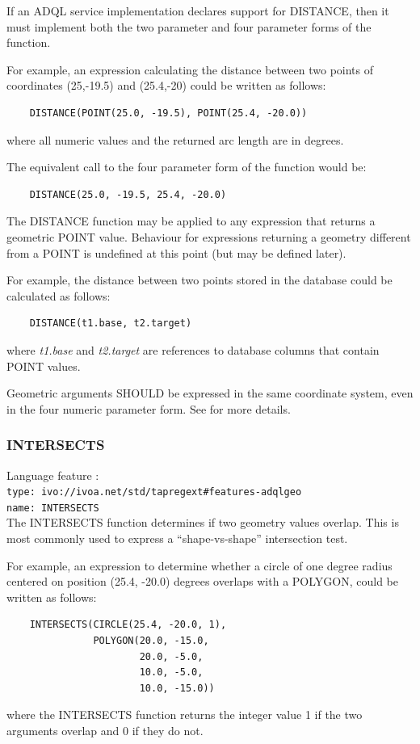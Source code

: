 \documentclass[11pt,a4paper]{ivoa}
\begin{document}
If an ADQL service implementation declares support for DISTANCE,
then it must implement both the two parameter and four parameter
forms of the function.

For example, an expression calculating the distance between two points of
coordinates (25,-19.5) and (25.4,-20) could be written as follows:
\begin{verbatim}
    DISTANCE(POINT(25.0, -19.5), POINT(25.4, -20.0))
\end{verbatim}
\noindent
where all numeric values and the returned arc length are in degrees.

The equivalent call to the four parameter form of the function would be:
\begin{verbatim}
    DISTANCE(25.0, -19.5, 25.4, -20.0)
\end{verbatim}

The DISTANCE function may be applied to any expression that returns a
geometric POINT value. Behaviour for expressions returning a geometry different
from a POINT is undefined at this point (but may be defined later).

For example, the distance between two points stored in the database could
be calculated as follows:
\begin{verbatim}
    DISTANCE(t1.base, t2.target)
\end{verbatim}
\noindent
where \textit{t1.base} and \textit{t2.target} are references to
database columns that contain POINT values.

Geometric arguments SHOULD be expressed in the same coordinate system, even in
the four numeric parameter form. See  for
more details.

\subsubsection{INTERSECTS}
\label{sec:functions.geom.intersects}
{\footnotesize Language feature :}\\
{\footnotesize \verb|type: ivo://ivoa.net/std/tapregext#features-adqlgeo|}\\
{\footnotesize \verb|name: INTERSECTS|}\\

The INTERSECTS function determines if two geometry values overlap. This is
most commonly used to express a ``shape-vs-shape'' intersection test.

For example, an expression to determine whether a circle of one degree radius
centered on position (25.4, -20.0) degrees overlaps with a POLYGON, could be
written as follows:
\begin{verbatim}
    INTERSECTS(CIRCLE(25.4, -20.0, 1),
               POLYGON(20.0, -15.0,
                       20.0, -5.0,
                       10.0, -5.0,
                       10.0, -15.0))
\end{verbatim}
\noindent
where the INTERSECTS function returns the integer value 1 if the two arguments
overlap and 0 if they do not.
\end{document}
